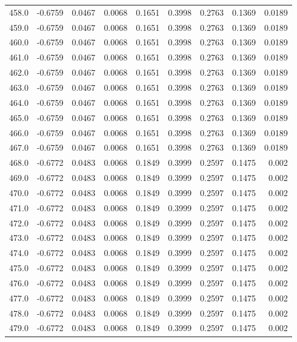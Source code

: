 \begin{longtable}{lrrrrrrrr}
458.0 & -0.6759 & 0.0467 & 0.0068 & 0.1651 & 0.3998 & 0.2763 & 0.1369 & 0.0189 \\
459.0 & -0.6759 & 0.0467 & 0.0068 & 0.1651 & 0.3998 & 0.2763 & 0.1369 & 0.0189 \\
460.0 & -0.6759 & 0.0467 & 0.0068 & 0.1651 & 0.3998 & 0.2763 & 0.1369 & 0.0189 \\
461.0 & -0.6759 & 0.0467 & 0.0068 & 0.1651 & 0.3998 & 0.2763 & 0.1369 & 0.0189 \\
462.0 & -0.6759 & 0.0467 & 0.0068 & 0.1651 & 0.3998 & 0.2763 & 0.1369 & 0.0189 \\
463.0 & -0.6759 & 0.0467 & 0.0068 & 0.1651 & 0.3998 & 0.2763 & 0.1369 & 0.0189 \\
464.0 & -0.6759 & 0.0467 & 0.0068 & 0.1651 & 0.3998 & 0.2763 & 0.1369 & 0.0189 \\
465.0 & -0.6759 & 0.0467 & 0.0068 & 0.1651 & 0.3998 & 0.2763 & 0.1369 & 0.0189 \\
466.0 & -0.6759 & 0.0467 & 0.0068 & 0.1651 & 0.3998 & 0.2763 & 0.1369 & 0.0189 \\
467.0 & -0.6759 & 0.0467 & 0.0068 & 0.1651 & 0.3998 & 0.2763 & 0.1369 & 0.0189 \\
468.0 & -0.6772 & 0.0483 & 0.0068 & 0.1849 & 0.3999 & 0.2597 & 0.1475 & 0.002 \\
469.0 & -0.6772 & 0.0483 & 0.0068 & 0.1849 & 0.3999 & 0.2597 & 0.1475 & 0.002 \\
470.0 & -0.6772 & 0.0483 & 0.0068 & 0.1849 & 0.3999 & 0.2597 & 0.1475 & 0.002 \\
471.0 & -0.6772 & 0.0483 & 0.0068 & 0.1849 & 0.3999 & 0.2597 & 0.1475 & 0.002 \\
472.0 & -0.6772 & 0.0483 & 0.0068 & 0.1849 & 0.3999 & 0.2597 & 0.1475 & 0.002 \\
473.0 & -0.6772 & 0.0483 & 0.0068 & 0.1849 & 0.3999 & 0.2597 & 0.1475 & 0.002 \\
474.0 & -0.6772 & 0.0483 & 0.0068 & 0.1849 & 0.3999 & 0.2597 & 0.1475 & 0.002 \\
475.0 & -0.6772 & 0.0483 & 0.0068 & 0.1849 & 0.3999 & 0.2597 & 0.1475 & 0.002 \\
476.0 & -0.6772 & 0.0483 & 0.0068 & 0.1849 & 0.3999 & 0.2597 & 0.1475 & 0.002 \\
477.0 & -0.6772 & 0.0483 & 0.0068 & 0.1849 & 0.3999 & 0.2597 & 0.1475 & 0.002 \\
478.0 & -0.6772 & 0.0483 & 0.0068 & 0.1849 & 0.3999 & 0.2597 & 0.1475 & 0.002 \\
479.0 & -0.6772 & 0.0483 & 0.0068 & 0.1849 & 0.3999 & 0.2597 & 0.1475 & 0.002 \\

\end{longtable}
